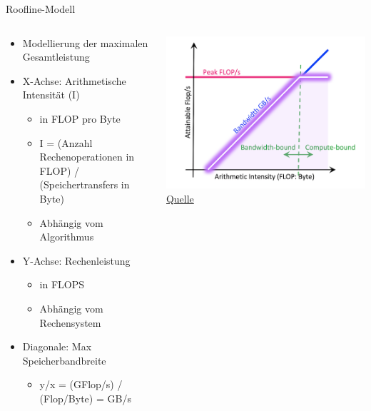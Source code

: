 \documentclass[
  german,            %
  aspectratio=169,    %
]{tumbeamer}
\begin{document}
\begin{frame}[c, fragile]{Roofline-Modell}{}
	\begin{columns}[c]
		\begin{column}{0.51\textwidth}
			\begin{itemize}
				\item Modellierung der maximalen Gesamtleistung
				\item X-Achse: Arithmetische Intensität (I)
				\begin{itemize}
					\item in FLOP pro Byte
					\item I = (Anzahl Rechenoperationen in FLOP) / (Speichertransfers in Byte)
					\item Abhängig vom Algorithmus
				\end{itemize}
				\item Y-Achse: Rechenleistung
				\begin{itemize}
					\item in FLOPS
					\item Abhängig vom Rechensystem
				\end{itemize}
				\item Diagonale: Max Speicherbandbreite
				\begin{itemize}
					\item y/x = (GFlop/s) / (Flop/Byte) = GB/s
				\end{itemize}
			\end{itemize}
		\end{column}
		\begin{column}{0.5\textwidth}
			\centering
			\includegraphics[width=\textwidth]{w10_roofline_google.png}
			\tiny{\href{https://docs.nersc.gov/tools/performance/roofline/}{Quelle}}
		\end{column}
	\end{columns}
\end{frame}
\end{document}
